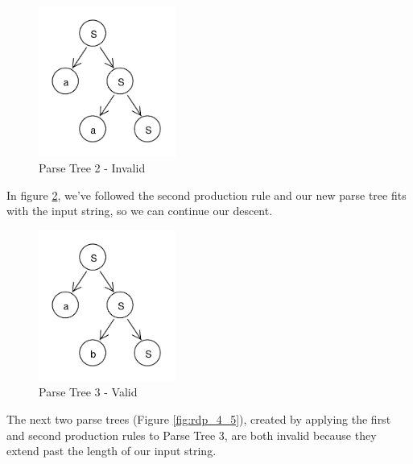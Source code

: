 \documentclass[11pt]{article}
\begin{document}
\begin{figure}[h!]
    \centering
    \includegraphics[width=0.4\textwidth,natwidth=30,natheight=30]{umlet/rdp_2.pdf}
    \caption{Parse Tree 2 - Invalid}
    \label{fig:rdp_2}
\end{figure}

In figure \ref{fig:rdp_3}, we've followed the second production rule
and our new parse tree fits with the input string, so we can continue our descent.

\begin{figure}[h!]
    \centering
    \includegraphics[width=0.4\textwidth,natwidth=30,natheight=30]{umlet/rdp_3.pdf}
    \caption{Parse Tree 3 - Valid}
    \label{fig:rdp_3}
\end{figure}

The next two parse trees (Figure \ref{fig:rdp_4_5}), created by applying the first and second production rules to
Parse Tree 3, are both invalid because they extend past the length of our input string.
\end{document}
